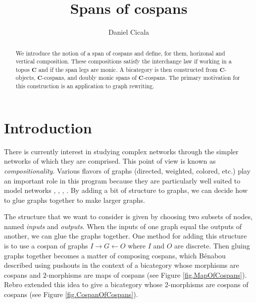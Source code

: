 \documentclass[11pt]{amsart}
\newcommand{\cat}[1]{\mathbf{#1}}
\theoremstyle{remark}
\theoremstyle{definition}
\begin{document}

\begin{abstract}
	We introduce the notion of a span of cospans and define, for them, horizonal and vertical composition.  These compositions satisfy the interchange law if working in a topos $\cat{C}$ and if the span legs are monic. A bicategory is then constructed from $\cat{C}$-objects, $\cat{C}$-cospans, and doubly monic spans of $\cat{C}$-cospans. The primary motivation for this construction is an application to graph rewriting.
\end{abstract}

\title{Spans of cospans}
\author{Daniel Cicala}
\maketitle

%
\section{Introduction} %
%

There is currently interest in studying complex networks through the simpler networks of which they are comprised. This point of view is known as \textit{compositionality}. Various flavors of graphs (directed, weighted, colored, etc.) play an important role in this program because they are particularly well suited to model networks \cite{Baez_CompFrameMarkovProcess}, \cite{Baez_CompFrameLinearNetworks}, \cite{RoseSabadinWalters_SepAlgNCospansGraphs}, \cite{RoseSabadinWalters_CalcColimsComp}. By adding a bit of structure to graphs, we can decide how to glue graphs together to make larger graphs.  

The structure that we want to consider is given by choosing two subsets of nodes, named \textit{inputs} and \textit{outputs}. When the inputs of one graph equal the outputs of another, we can glue the graphs together. One method for adding this structure is to use a cospan of graphs $I \to G \leftarrow O$ where $I$ and $O$ are discrete. Then gluing graphs together becomes a matter of composing cospans, which B\'{e}nabou \cite{Benabou_Bicats} described using pushouts in the context of a bicategory whose morphisms are cospans and $2$-morphisms are maps of cospans (see Figure \ref{fig.MapOfCospans}). Rebro \cite{Rebro_Span2} extended this idea to give a bicategory whose $2$-morphisms are cospans of cospans (see Figure \ref{fig.CospanOfCospans}).  
\end{document}
